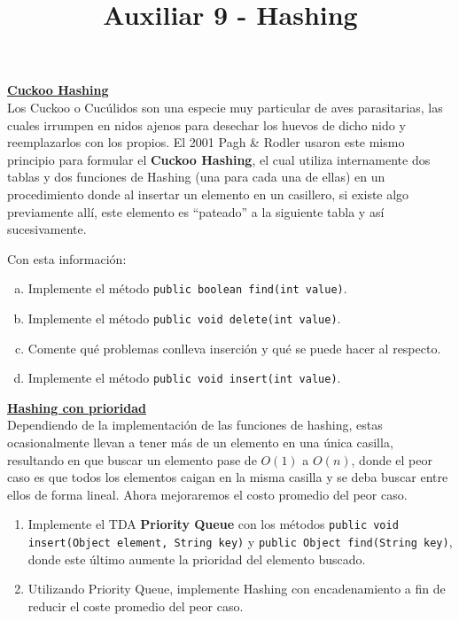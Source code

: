 \documentclass[dcc,uchile]{fcfmcourse}
\title{Auxiliar 9 - Hashing}
\newcommand{\ptitle}[1]{\underline{\textbf{#1}}}
\begin{document}
\maketitle

\vspace{-1ex}


\begin{problems}


\problem \ptitle{Cuckoo Hashing}\\
Los Cuckoo o Cucúlidos son una especie muy particular de aves parasitarias, las cuales irrumpen en nidos ajenos para desechar los huevos de dicho nido y reemplazarlos con los propios. El 2001 Pagh \& Rodler usaron este mismo principio para formular el \textbf{Cuckoo Hashing}, el cual utiliza internamente dos tablas y dos funciones de Hashing (una para cada una de ellas) en un procedimiento donde al insertar un elemento en un casillero, si existe algo previamente allí, este elemento es ``pateado'' a la siguiente tabla y así sucesivamente. 

Con esta información:
\begin{enumerate}[a)]
    \item Implemente el método \texttt{public boolean find(int value)}.
    \item Implemente el método \texttt{public void delete(int value)}.
    \item Comente qué problemas conlleva inserción y qué se puede hacer al respecto.
    \item Implemente el método \texttt{public void insert(int value)}.
\end{enumerate}


\problem \ptitle{Hashing con prioridad}\\
Dependiendo de la implementación de las funciones de hashing, estas ocasionalmente llevan a tener más de un elemento en una única casilla, resultando en que buscar un elemento pase de $O(1)$ a $O(n)$, donde el peor caso es que todos los elementos caigan en la misma casilla y se deba buscar entre ellos de forma lineal. Ahora mejoraremos el costo promedio del peor caso.
\begin{enumerate}
    \item Implemente el TDA \textbf{Priority Queue} con los métodos \texttt{public void insert(Object element, String key)} y \texttt{public Object find(String key)}, donde este último aumente la prioridad del elemento buscado.
    \item Utilizando Priority Queue, implemente Hashing con encadenamiento a fin de reducir el coste promedio del peor caso.
\end{enumerate}

\end{problems}
\end{document}
